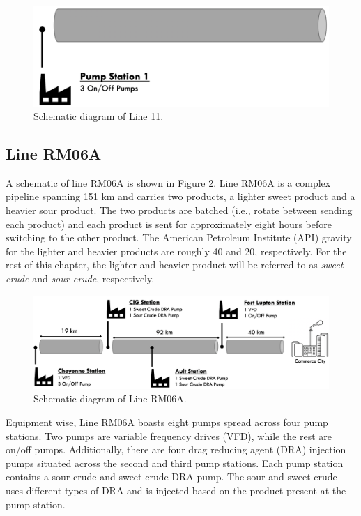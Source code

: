 \begin{figure}[h]
    \centering
    \includegraphics[scale=0.45]{images/08Line11.png}
    \caption{Schematic diagram of Line 11.}
    \label{fig:08Line11}
\end{figure}


\subsection{Line RM06A}
A schematic of line RM06A is shown in Figure \ref{fig:08RM06A}.  Line RM06A is a complex pipeline spanning 151 km and carries two products, a lighter sweet product and a heavier sour product. The two products are batched (i.e., rotate between sending each product) and each product is sent for approximately eight hours before switching to the other product. The American Petroleum Institute (API) gravity for the lighter and heavier products are roughly 40 and 20, respectively. For the rest of this chapter, the lighter and heavier product will be referred to as \textit{sweet crude} and \textit{sour crude}, respectively.

\begin{figure}[h]
    \centering
    \includegraphics[scale=0.35]{images/08RM06A.png}
    \caption{Schematic diagram of Line RM06A.}
    \label{fig:08RM06A}
\end{figure}

Equipment wise, Line RM06A boasts eight pumps spread across four pump stations. Two pumps are variable frequency drives (VFD), while the rest are on/off pumps. Additionally, there are four drag reducing agent (DRA) injection pumps situated across the second and third pump stations. Each pump station contains a sour crude and sweet crude DRA pump. The sour and sweet crude uses different types of DRA and is injected based on the product present at the pump station. 



